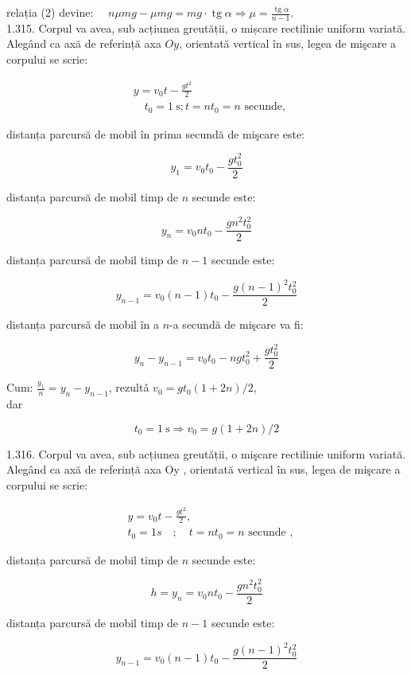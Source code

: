 relația (2) devine: $\quad n \mu m g-\mu m g=m g \cdot \operatorname{tg} \alpha \Rightarrow \mu=\frac{\operatorname{tg} \alpha}{n-1}$.\\
1.315. Corpul va avea, sub acțiunea greutății, o mișcare rectilinie uniform variată. Alegând ca axă de referință axa $O y$, orientată vertical în sus, legea de mişcare a corpului se scrie:

$$
\begin{aligned}
& y=v_{0} t-\frac{g t^{2}}{2} \\
& \quad t_{0}=1 \mathrm{~s} ; t=n t_{0}=n \text { secunde, }
\end{aligned}
$$

distanța parcursă de mobil în prima secundă de mişcare este:

$$
y_{1}=v_{0} t_{0}-\frac{g t_{0}^{2}}{2}
$$

distanța parcursă de mobil timp de $n$ secunde este:

$$
y_{n}=v_{0} n t_{0}-\frac{g n^{2} t_{0}^{2}}{2}
$$

distanța parcursă de mobil timp de $n-1$ secunde este:

$$
y_{n-1}=v_{0}(n-1) t_{0}-\frac{g(n-1)^{2} t_{0}^{2}}{2}
$$

distanța parcursă de mobil în a $n$-a secundă de mişcare va fi:

$$
y_{n}-y_{n-1}=v_{0} t_{0}-n g t_{0}^{2}+\frac{g t_{0}^{2}}{2}
$$

Cum: $\frac{y_{1}}{n}=y_{n}-y_{n-1}$, rezultǎ $v_{0}=g t_{0}(1+2 n) / 2$,\\
dar

$$
t_{0}=1 \mathrm{~s} \Rightarrow v_{0}=g(1+2 n) / 2
$$

1.316. Corpul va avea, sub acțiunea greutății, o mişcare rectilinie uniform variată. Alegând ca axă de referință axa Oy , orientată vertical în sus, legea de mişcare a corpului se scrie:

$$
\begin{aligned}
& y=v_{0} t-\frac{g t^{2}}{2}, \\
& t_{0}=1 s \quad ; \quad t=n t_{0}=n \text { secunde },
\end{aligned}
$$

distanța parcursă de mobil timp de $n$ secunde este:

$$
h=y_{n}=v_{0} n t_{0}-\frac{g n^{2} t_{0}^{2}}{2}
$$

distanța parcursă de mobil timp de $n-1$ secunde este:

$$
y_{n-1}=v_{0}(n-1) t_{0}-\frac{g(n-1)^{2} t_{0}^{2}}{2}
$$

